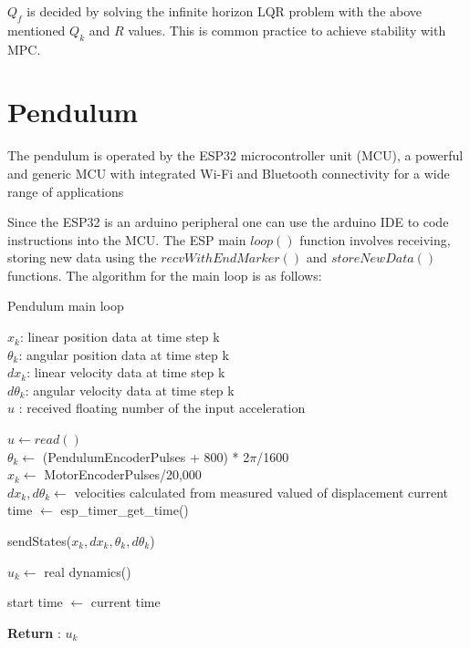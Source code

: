 $Q_f$ is decided by solving the infinite horizon LQR problem with the above mentioned $Q_k$ and $R$ values. This is common practice to achieve stability with MPC.


\section{Pendulum}

The pendulum is operated by the ESP32 microcontroller unit (MCU), a powerful and generic MCU with integrated Wi-Fi and Bluetooth connectivity for a wide range of applications \cite{ESPManual}

Since the ESP32 is an arduino peripheral one can use the arduino IDE to code instructions into the MCU. The ESP main $loop()$ function involves receiving, storing new data using the $recvWithEndMarker()$ and $storeNewData()$ functions. 
The algorithm for the main loop is as follows: 


\begin{algorithm}[H]
	\caption{Pendulum main loop}\label{alg:two}
	\KwData
	{	$x_k$: linear position data at time step k \\
		\hspace{1.4cm}$\theta_k$: angular position data at time step k \\
		\hspace{1.4cm}$dx_k$: linear velocity data at time step k \\
		\hspace{1.4cm}$d\theta_k$: angular velocity data at time step k \\
		\hspace{1.4cm}$u$ : received floating number of the input acceleration
	}
	
	
	
	
	\hspace{2mm}$u \gets read()$   \\
	
	\hspace{2mm}$\theta_k \gets$ (PendulumEncoderPulses + 800) * 2$\pi$/1600 \\
	$x_k  \gets $ MotorEncoderPulses/20,000  \cite{PendulumManual} \\
	
	{
		$dx_k , d\theta_k \gets $ velocities calculated from measured valued of displacement 
	}
	{
		current time $\gets$ esp\_timer\_get\_time()  
	}
	
	sendStates($x_k, dx_k, \theta_k, d\theta_k$)      
	
	$u_k \gets$ real dynamics() \Comment {}
	
	start time $\gets$ current time    
	
	\textbf{Return} : $u_k$
	
\end{algorithm}
\clearpage


